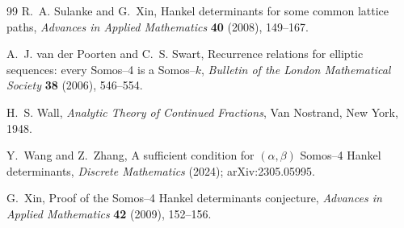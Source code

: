\documentclass[11pt]{article}
\theoremstyle{remark}
\begin{document}
\begin{thebibliography}{99}
R.~A. Sulanke and G.~Xin,
\newblock Hankel determinants for some common lattice paths,
\newblock \emph{Advances in Applied Mathematics} \textbf{40} (2008), 149--167.

A.~J. van der Poorten and C.~S. Swart,
\newblock Recurrence relations for elliptic sequences: every Somos--4 is a Somos--$k$,
\newblock \emph{Bulletin of the London Mathematical Society} \textbf{38} (2006), 546--554.

H.~S. Wall,
\newblock \emph{Analytic Theory of Continued Fractions},
\newblock Van Nostrand, New York, 1948.

Y.~Wang and Z.~Zhang,
\newblock A sufficient condition for $(\alpha,\beta)$ Somos--4 Hankel determinants,
\newblock \emph{Discrete Mathematics} (2024);
\newblock arXiv:2305.05995.

G.~Xin,
\newblock Proof of the Somos--4 Hankel determinants conjecture,
\newblock \emph{Advances in Applied Mathematics} \textbf{42} (2009), 152--156.

\end{thebibliography}
\end{document}
